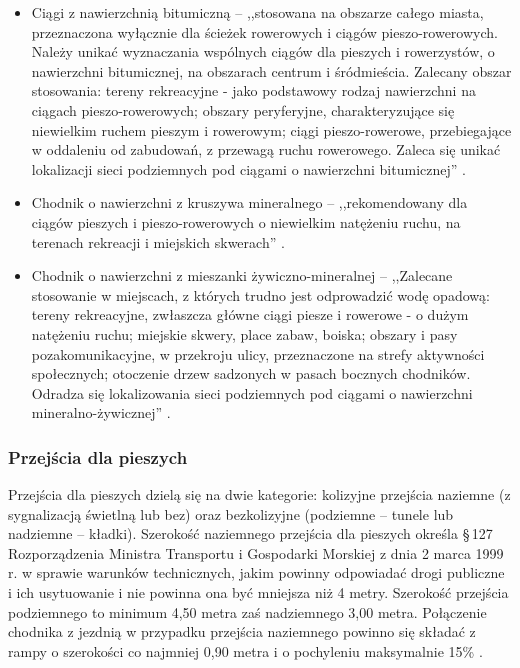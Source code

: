 \documentclass[twoside,12pt]{article}
\begin{document}
	 \begin{itemize}\setlength{\itemsep}{0em}
	 \item Ciągi z nawierzchnią bitumiczną --  ,,stosowana na obszarze całego miasta, przeznaczona wyłącznie dla ścieżek rowerowych i ciągów pieszo-rowerowych. Należy unikać wyznaczania wspólnych ciągów dla pieszych i rowerzystów, o nawierzchni bitumicznej, na obszarach centrum i śródmieścia. Zalecany obszar stosowania: tereny rekreacyjne - jako podstawowy rodzaj nawierzchni na ciągach pieszo-rowerowych;  obszary peryferyjne, charakteryzujące się niewielkim ruchem pieszym i rowerowym; ciągi pieszo-rowerowe, przebiegające w oddaleniu od zabudowań, z przewagą ruchu rowerowego.  Zaleca się unikać lokalizacji sieci podziemnych pod ciągami o nawierzchni bitumicznej'' \cite{standardy_wroclaw}. 
	\item Chodnik o nawierzchni z kruszywa mineralnego -- ,,rekomendowany dla ciągów pieszych i pieszo-rowerowych o niewielkim natężeniu ruchu, na terenach rekreacji i miejskich skwerach'' \cite{standardy_wroclaw}.
	\item Chodnik o nawierzchni z mieszanki żywiczno-mineralnej -- ,,Zalecane stosowanie w miejscach, z których trudno jest odprowadzić wodę opadową: tereny rekreacyjne, zwłaszcza główne ciągi piesze i rowerowe - o dużym natężeniu ruchu;  miejskie skwery, place zabaw, boiska; obszary i pasy pozakomunikacyjne, w przekroju ulicy, przeznaczone na strefy aktywności społecznych; otoczenie drzew sadzonych w pasach bocznych chodników. Odradza się lokalizowania sieci podziemnych pod ciągami o nawierzchni mineralno-żywicznej'' \cite{standardy_wroclaw}. 
	 \end{itemize}
	 
	 \subsubsection{Przejścia dla pieszych}
	 
	 Przejścia dla pieszych dzielą się na dwie kategorie: kolizyjne przejścia naziemne (z sygnalizacją świetlną lub bez) oraz bezkolizyjne (podziemne -- tunele lub nadziemne -- kładki). Szerokość naziemnego przejścia dla pieszych określa §\,127 Rozporządzenia Ministra Transportu i Gospodarki Morskiej z dnia 2 marca 1999 r. w sprawie warunków technicznych, jakim powinny odpowiadać drogi publiczne i ich usytuowanie i nie powinna ona być mniejsza niż 4 metry. Szerokość przejścia podziemnego to minimum 4,50 metra zaś nadziemnego 3,00 metra. Połączenie chodnika z jezdnią w przypadku przejścia naziemnego powinno się składać z rampy o szerokości co najmniej 0,90 metra i o pochyleniu maksymalnie 15\% \cite{rozporzadzenie_drogi}.
	 
\end{document}
